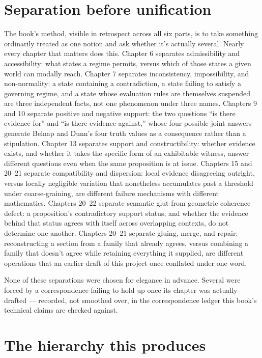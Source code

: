 \hypertarget{separation-before-unification}{%
\section{Separation before unification}\label{separation-before-unification}}

The book's method, visible in retrospect across all six parts, is to
take something ordinarily treated as one notion and ask whether it's
actually several. Nearly every chapter that matters does this. Chapter 6
separates admissibility and accessibility: what states a regime permits,
versus which of those states a given world can modally reach. Chapter 7
separates inconsistency, impossibility, and non-normality: a state
containing a contradiction, a state failing to satisfy a governing
regime, and a state whose evaluation rules are themselves suspended are
three independent facts, not one phenomenon under three names. Chapters
9 and 10 separate positive and negative support: the two questions ``is
there evidence for'' and ``is there evidence against,'' whose four
possible joint answers generate Belnap and Dunn's four truth values as a
consequence rather than a stipulation. Chapter 13 separates support and
constructibility: whether evidence exists, and whether it takes the
specific form of an exhibitable witness, answer different questions even
when the same proposition is at issue. Chapters 15 and 20--21 separate
compatibility and dispersion: local evidence disagreeing outright, versus
locally negligible variation that nonetheless accumulates past a
threshold under coarse-graining, are different failure mechanisms with
different mathematics. Chapters 20--22 separate semantic glut from
geometric coherence defect: a proposition's contradictory support status,
and whether the evidence behind that status agrees with itself across
overlapping contexts, do not determine one another. Chapters 20--21
separate gluing, merge, and repair: reconstructing a section from a
family that already agrees, versus combining a family that doesn't agree
while retaining everything it supplied, are different operations that an
earlier draft of this project once conflated under one word.

None of these separations were chosen for elegance in advance. Several
were forced by a correspondence failing to hold up once its chapter was
actually drafted --- recorded, not smoothed over, in the correspondence
ledger this book's technical claims are checked against.

\hypertarget{the-hierarchy-this-produces}{%
\section{The hierarchy this produces}\label{the-hierarchy-this-produces}}

